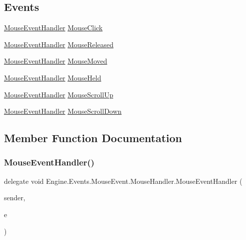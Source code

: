 \subsection*{Events}
\begin{DoxyCompactItemize}
\item 
\hyperlink{a00378_a932e0a6ed83094bb6fa33a6ae64be38a}{Mouse\+Event\+Handler} \hyperlink{a00378_ae6859271609356f4c6e30fbdcdda28a9}{Mouse\+Click}
\item 
\hyperlink{a00378_a932e0a6ed83094bb6fa33a6ae64be38a}{Mouse\+Event\+Handler} \hyperlink{a00378_aa7e294c0752f892e917d7788818dd685}{Mouse\+Released}
\item 
\hyperlink{a00378_a932e0a6ed83094bb6fa33a6ae64be38a}{Mouse\+Event\+Handler} \hyperlink{a00378_a6d61cfd953bda3531ea16380df4d8e59}{Mouse\+Moved}
\item 
\hyperlink{a00378_a932e0a6ed83094bb6fa33a6ae64be38a}{Mouse\+Event\+Handler} \hyperlink{a00378_ac2b72a0951f5946b97d65479cacb5634}{Mouse\+Held}
\item 
\hyperlink{a00378_a932e0a6ed83094bb6fa33a6ae64be38a}{Mouse\+Event\+Handler} \hyperlink{a00378_aa534e523c05b4c0eb558a62e932c063a}{Mouse\+Scroll\+Up}
\item 
\hyperlink{a00378_a932e0a6ed83094bb6fa33a6ae64be38a}{Mouse\+Event\+Handler} \hyperlink{a00378_aba8754542d3586f246a92a726427bf73}{Mouse\+Scroll\+Down}
\end{DoxyCompactItemize}


\subsection{Member Function Documentation}
\mbox{\label{a00378_a932e0a6ed83094bb6fa33a6ae64be38a}} 
\subsubsection{\texorpdfstring{Mouse\+Event\+Handler()}{MouseEventHandler()}}
{\footnotesize\ttfamily delegate void Engine.\+Events.\+Mouse\+Event.\+Mouse\+Handler.\+Mouse\+Event\+Handler (\begin{DoxyParamCaption}\item[{object}]{sender,  }\item[{\hyperlink{a00374}{Mouse\+Event\+Args}}]{e }\end{DoxyParamCaption})}

